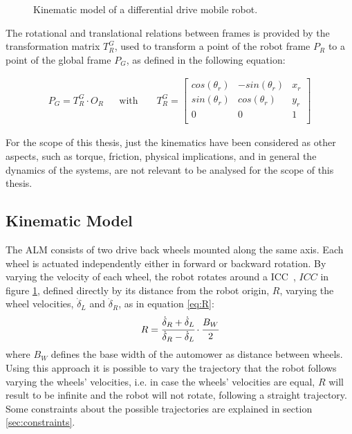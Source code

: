 \begin{figure}[!ht]
  \caption{Kinematic model of a differential drive mobile robot.}
  \label{fig:TikzKine}
\end{figure}

The rotational and translational relations between frames is provided by the transformation matrix $T^G_R$, used to transform a point of the robot frame $P_R$ to a point of the global frame $P_G$, as defined in the following equation: 

\begin{align}
P_{G} = T^G_R \cdot O_{R} && \text{with } && T^G_R = 
\begin{bmatrix}
cos(\theta_r) & -sin(\theta_r) & x_r \\
sin(\theta_r) & cos(\theta_r) & y_r \\
0 & 0 & 1 \\
\end{bmatrix} 
\label{eq:transfPoint}
\end{align}

For the scope of this thesis, just the kinematics have been considered as other aspects, such as torque, friction, physical implications, and in general the dynamics of the systems, are not relevant to be analysed for the scope of this thesis.

\subsection{Kinematic Model}

\noindent 
The \gls{ALM} consists of two drive back wheels mounted along the same axis. 
Each wheel is actuated independently either in forward or backward rotation.
By varying the velocity of each wheel, the robot rotates around a \gls{ICC}~\cite{ICC}, $ICC$ in figure \ref{fig:TikzKine}, defined directly by its distance from the robot origin, $R$, varying the wheel velocities, $\dot \delta_L$ and $\dot \delta_R$, as in equation \eqref{eq:R}:
\begin{equation}
    R = \cfrac{\dot \delta_R + \dot \delta_L}{\dot \delta_R - \dot \delta_L} \cdot \cfrac{B_W}{2}
    \label{eq:R}
\end{equation}
where $B_W$ defines the base width of the automower as distance between wheels.
Using this approach it is possible to vary the trajectory that the robot follows varying the wheels' velocities, i.e. in case the wheels' velocities are equal, $R$ will result to be infinite and the robot will not rotate, following a straight trajectory.
Some constraints about the possible trajectories are explained in section \ref{sec:constraints}.


